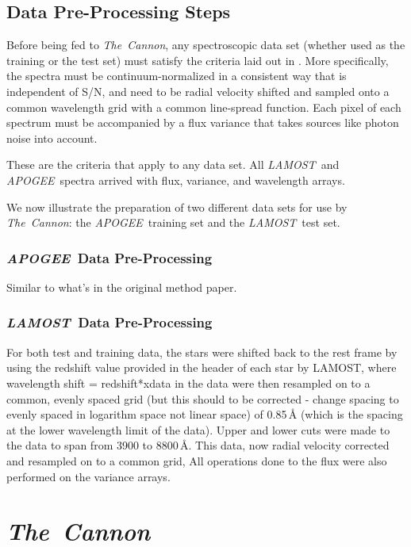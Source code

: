 \documentclass[12pt, preprint]{aastex}
\newcommand{\tc}{\textsl{The~Cannon}}
\newcommand{\apogee}{\textsl{APOGEE}}
\newcommand{\lamost}{\textsl{LAMOST}}
\begin{document}
\subsection{Data Pre-Processing Steps}

Before being fed to \tc, any spectroscopic data set (whether used as the 
training or the test set) must satisfy the criteria laid out in 
\citep{ness2015}. More specifically, the spectra must be
continuum-normalized in a consistent way that is independent of S/N, and need
to be radial velocity shifted and sampled onto a common wavelength grid with
a common line-spread function. Each pixel of each spectrum must be accompanied
by a flux variance that takes sources like photon noise into account. 

These are the criteria that apply to any data set. All \lamost\ and \apogee\
spectra arrived with flux, variance, and wavelength arrays. 

We now illustrate the 
preparation of two different data sets for use by \tc: the \apogee\ training
set and the \lamost\ test set. 

\subsubsection{\apogee\ Data Pre-Processing}

Similar to what's in the original method paper.

\subsubsection{\lamost\ Data Pre-Processing}

For both test and training data, the stars were shifted back to the rest frame 
by using the redshift value provided in the header of each star by LAMOST, 
where wavelength shift = redshift*xdata in the data were then resampled on to 
a common, evenly spaced grid (but this should to be corrected - change spacing 
to evenly spaced in logarithm space not linear space) of 0.85\,$\mbox{\AA}$ 
(which is the spacing at the lower wavelength limit of the data). Upper and 
lower cuts were made to the data to span from 3900 to 8800\,$\mbox{\AA}$.
This data, now radial velocity corrected and resampled on to a common grid, 
All operations done to the flux were also performed 
on the variance arrays. 
\section{\tc}
\end{document}
